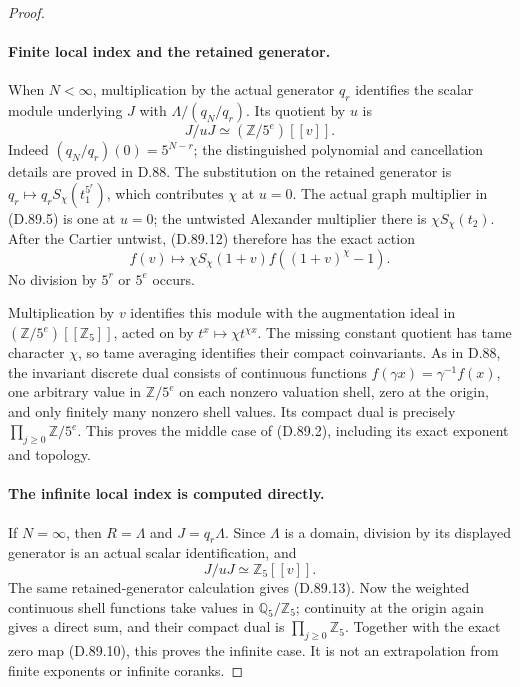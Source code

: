 \begin{proof}
\paragraph{Finite local index and the retained generator.}
When \(N<\infty\), multiplication by the actual generator
\(q_r\) identifies the scalar module underlying \(J\)
with \(\Lambda/(q_N/q_r)\). Its quotient by \(u\) is
\[
                         J/uJ\simeq(\mathbb Z/5^e)[[v]].
                                                               \tag{D.89.12}
\]
Indeed \((q_N/q_r)(0)=5^{N-r}\); the distinguished
polynomial and cancellation details are proved in D.88.
The substitution on the retained generator is
\(q_r\mapsto q_rS_\chi(t_1^{5^r})\), which contributes
\(\chi\) at \(u=0\). The actual graph multiplier in
(D.89.5) is one at \(u=0\); the untwisted Alexander
multiplier there is \(\chi S_\chi(t_2)\).
After the Cartier untwist, (D.89.12) therefore has the exact
action
\[
       f(v)\longmapsto\chi S_\chi(1+v)
                       f((1+v)^\chi-1).                \tag{D.89.13}
\]
No division by \(5^r\) or \(5^e\) occurs.

Multiplication by \(v\) identifies this module with the
augmentation ideal in
\((\mathbb Z/5^e)[[\mathbb Z_5]]\), acted on by
\(t^x\mapsto\chi t^{\chi x}\). The missing constant
quotient has tame character \(\chi\), so tame averaging
identifies their compact coinvariants. As in D.88, the
invariant discrete dual consists of continuous functions
\(f(\gamma x)=\gamma^{-1}f(x)\), one arbitrary value
in \(\mathbb Z/5^e\) on each nonzero valuation shell,
zero at the origin, and only finitely many nonzero shell
values. Its compact dual is precisely
\(\prod_{j\ge0}\mathbb Z/5^e\). This proves the middle
case of (D.89.2), including its exact exponent and topology.

\paragraph{The infinite local index is computed directly.}
If \(N=\infty\), then \(R=\Lambda\) and
\(J=q_r\Lambda\). Since \(\Lambda\) is a domain,
division by its displayed generator is an actual scalar
identification, and
\[
                            J/uJ\simeq\mathbb Z_5[[v]].
                                                               \tag{D.89.14}
\]
The same retained-generator calculation gives (D.89.13).
Now the weighted continuous shell functions take values in
\(\mathbb Q_5/\mathbb Z_5\); continuity at the origin
again gives a direct sum, and their compact dual is
\(\prod_{j\ge0}\mathbb Z_5\). Together with the exact
zero map (D.89.10), this proves the infinite case. It is not
an extrapolation from finite exponents or infinite coranks.


\end{proof}
